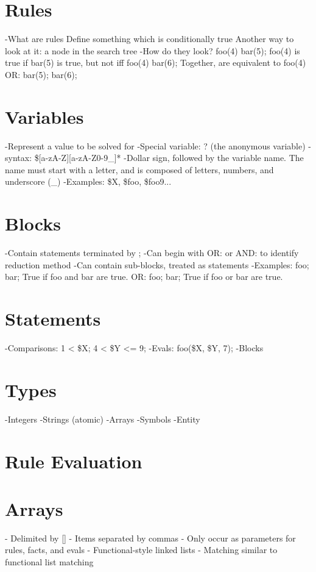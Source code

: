 \documentclass[onecolumn,titlepage]{article}
\begin{document}
\section{Rules}
-What are rules
   Define something which is conditionally true
   Another way to look at it: a node in the search tree
-How do they look?
   foo(4) { bar(5); }
    foo(4) is true if bar(5) is true, but not iff
   foo(4) { bar(6); }
   Together, are equivalent to 
   foo(4) {OR: bar(5); bar(6); }

\section{Variables}
-Represent a value to be solved for
-Special variable: ? (the anonymous variable)
-syntax: \$[a-zA-Z][a-zA-Z0-9_]*
-Dollar sign, followed by the variable name.  The name must start with a letter, and is composed of letters, numbers, and underscore (_)
-Examples: \$X, \$foo, \$foo9...

\section{Blocks}
-Contain statements terminated by ;
-Can begin with OR: or AND: to identify reduction method
-Can contain sub-blocks, treated as statements
-Examples:
  { 
    foo;
    bar;
  }
 True if foo and bar are true.
  {OR:
    foo;
    bar;
  }
 True if foo or bar are true.

\section{Statements}
-Comparisons:
   1 < \$X;
   4 < \$Y <= 9;
-Evals:
 foo(\$X, \$Y, 7);
-Blocks

\section{Types}
-Integers
-Strings (atomic)
-Arrays
-Symbols
-Entity

\section{Rule Evaluation}

\section{Arrays}
- Delimited by []
- Items separated by commas
- Only occur as parameters for rules, facts, and evals
- Functional-style linked lists
- Matching similar to functional list matching
\end{document}
